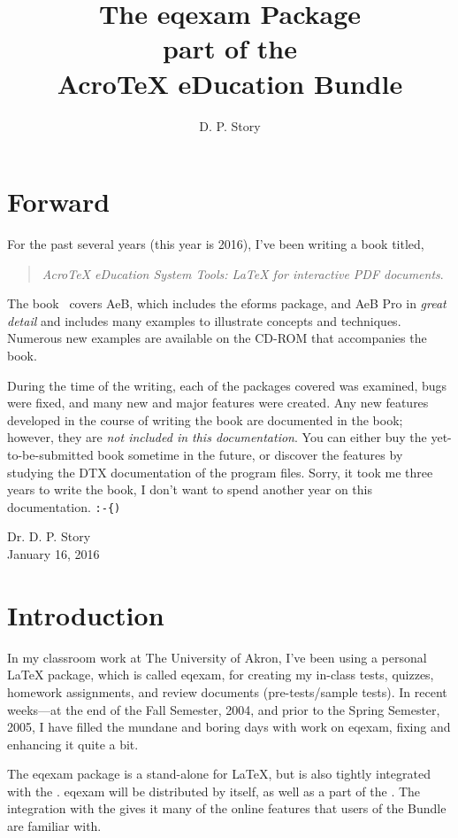 \documentclass{article}
\title{The \texorpdfstring{\textsf{eqexam} Package\\}{eqexam Package, }
part of the\texorpdfstring{\\Acro\TeX}{AcroTeX} eDucation Bundle}
\author{D. P. Story}
\def\AEBBook{\textsl{{Acro\!\TeX} eDucation System Tools: {\LaTeX} for interactive PDF documents}}
\def\AEBP{\textsf{AeB Pro}}
\let\pkg\textsf
\def\AEB{\textsf{AeB}}
\begin{document}
\maketitle

\tableofcontents

\section{Forward}

For the past several years (this year is 2016), I've been writing a book
titled,
\begin{quote}
\AEBBook.
\end{quote}
The book~\cite{book:AEBB} covers {\AEB}, which includes the \pkg{eforms}
package, and {\AEBP} in \emph{great detail} and includes many examples to
illustrate concepts and techniques. Numerous new examples are available on
the CD-ROM that accompanies the book.

During the time of the writing, each of the packages covered was examined,
bugs were fixed, and many new and major features were created. Any new
features developed in the course of writing the book are documented in the
book; however, they are \emph{not included in this documentation}. You can
either buy the yet-to-be-submitted book sometime in the future, or discover
the features by studying the DTX documentation of the program files. Sorry,
it took me three years to write the book, I don't want to spend another year
on this documentation. \verb!:-{)!

\begin{flushright}
Dr. D. P. Story\\[3pt]
January 16, 2016
\end{flushright}

\section{Introduction}

In my classroom work at The University of Akron, I've been using a
personal {\LaTeX} package, which is called \textsf{eqexam}, for creating
my in-class tests, quizzes, homework assignments, and review documents
(pre-tests/sample tests). In recent weeks---at the end of the Fall
Semester, 2004, and prior to the Spring Semester, 2005, I have filled the
mundane and boring days with work on \textsf{eqexam}, fixing and enhancing
it quite a bit.

The \textsf{eqexam} package is a stand-alone for {\LaTeX}, but is also
tightly integrated with the {\cAcroEB}. \textsf{eqexam} will be
distributed by itself, as well as a part of the {\cAcroB}. The integration
with the {\AcroB} gives it many of the online features that users of the
Bundle are familiar with.
\end{document}
